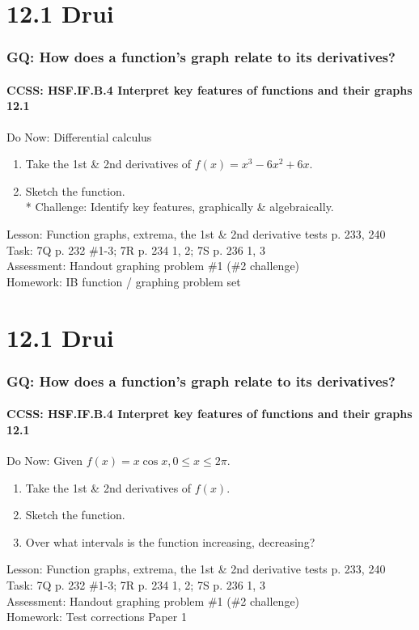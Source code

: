 \documentclass{beamer}
\begin{document}

\section{12.1 Drui}
  \frame
  {
    \frametitle{GQ: How does a function's graph relate to its derivatives?}
    \framesubtitle{CCSS: HSF.IF.B.4 Interpret key features of functions and their graphs \qquad \alert{12.1}}

    \begin{block}{Do Now: Differential calculus}
    \begin{enumerate}
        \item Take the 1st \& 2nd derivatives of $f(x)=x^3-6x^2+6x$.
        \item Sketch the function.\\*
        Challenge: Identify key features, graphically \& algebraically.
    \end{enumerate}
    \end{block}
    Lesson: Function graphs, extrema, the 1st \& 2nd derivative tests p. 233, 240\\%
    Task: 7Q p. 232 \#1-3; 7R p. 234 1, 2; 7S p. 236 1, 3 \\%
    Assessment: Handout graphing problem \#1 (\#2 challenge)
    \\%
    Homework: IB function / graphing problem set
  }

  \section{12.1 Drui}
  \frame
  {
    \frametitle{GQ: How does a function's graph relate to its derivatives?}
    \framesubtitle{CCSS: HSF.IF.B.4 Interpret key features of functions and their graphs \qquad \alert{12.1}}

    \begin{block}{Do Now: Given $f(x)=x \cos x, 0 \leq x \leq 2\pi$.}
    \begin{enumerate}
        \item Take the 1st \& 2nd derivatives of $f(x)$. \item Sketch the function. \item Over what intervals is the function increasing, decreasing?
    \end{enumerate}
    \end{block}
    Lesson: Function graphs, extrema, the 1st \& 2nd derivative tests p. 233, 240\\%
    Task: 7Q p. 232 \#1-3; 7R p. 234 1, 2; 7S p. 236 1, 3 \\%
    Assessment: Handout graphing problem \#1 (\#2 challenge)
    \\%
    Homework: Test corrections Paper 1
  }
\end{document}
